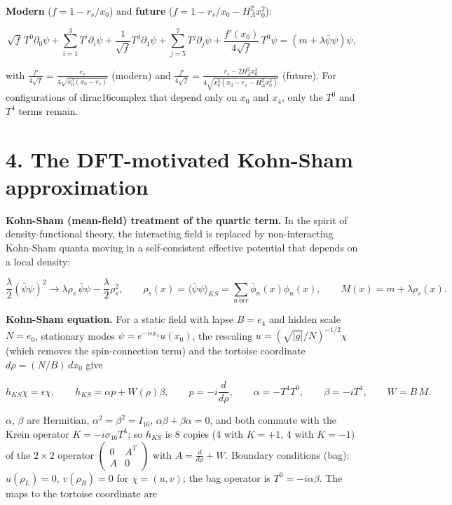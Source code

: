 \documentclass[10pt]{article}
\makeatletter
\newcommand\keepnext{\par\nopagebreak\@nobreaktrue\everypar{\@nobreakfalse\everypar{}}}
\makeatother
\begin{document}
\textbf{Modern} ($f = 1 - r_s/x_0$) and \textbf{future} ($f = 1 - r_s/x_0 - H_\Lambda^2x_0^2$):\keepnext


\[
\sqrt f\,T^0\partial_0\psi + \sum_{i=1}^{3}T^i\partial_i\psi + \frac{1}{\sqrt f}T^4\partial_4\psi + \sum_{j=5}^{7}T^j\partial_j\psi + \frac{f'(x_0)}{4\sqrt{f}}\,T^0\psi = (m + \lambda\bar\psi\psi)\psi ,
\]

with $\frac{f'}{4\sqrt f} = \frac{r_s}{4\sqrt{x_0^3(x_0-r_s)}}$ (modern) and $\frac{f'}{4\sqrt f} = \frac{r_s - 2H_\Lambda^2x_0^3}{4\sqrt{x_0^3(x_0 - r_s - H_\Lambda^2x_0^3)}}$ (future). For configurations of dirac16complex that depend only on $x_0$ and $x_4$, only the $T^0$ and $T^4$ terms remain.


\section*{4. The DFT-motivated Kohn-Sham approximation}

\textbf{Kohn-Sham (mean-field) treatment of the quartic term.} In the spirit of density-functional theory, the interacting field is replaced by non-interacting Kohn-Sham quanta moving in a self-consistent effective potential that depends on a local density:\keepnext


\[
\frac\lambda2(\bar\psi\psi)^2 \longrightarrow \lambda\rho_s\,\bar\psi\psi - \frac\lambda2\rho_s^2,\qquad \rho_s(x) = \langle\bar\psi\psi\rangle_{KS} = \sum_{n\ \mathrm{occ}}\bar\phi_n(x)\phi_n(x),\qquad M(x) = m + \lambda\rho_s(x).
\]

\textbf{Kohn-Sham equation.} For a static field with lapse $B = e_4$ and hidden scale $N = e_0$, stationary modes $\psi = e^{-i\epsilon x_4}u(x_0)$, the rescaling $u = (\sqrt{\lvert g\rvert}/N)^{-1/2}\chi$ (which removes the spin-connection term) and the tortoise coordinate $d\rho = (N/B)\,dx_0$ give\keepnext


\[
h_{KS}\chi = \epsilon\chi,\qquad h_{KS} = \alpha p + W(\rho)\beta,\qquad p = -i\frac{d}{d\rho},\qquad \alpha = -T^4T^0,\qquad \beta = -iT^4,\qquad W = B\,M .
\]

$\alpha$, $\beta$ are Hermitian, $\alpha^2 = \beta^2 = I_{16}$, $\alpha\beta + \beta\alpha = 0$, and both commute with the Krein operator $K = -i\sigma_{16}T^4$; so $h_{KS}$ is 8 copies (4 with $K=+1$, 4 with $K=-1$) of the $2\times2$ operator $\begin{pmatrix}0 & A^T\\ A & 0\end{pmatrix}$ with $A = \frac{d}{d\rho} + W$. Boundary conditions (bag): $u(\rho_L) = 0$, $v(\rho_R) = 0$ for $\chi = (u, v)$; the bag operator is $T^0 = -i\alpha\beta$. The maps to the tortoise coordinate are\keepnext
\end{document}

